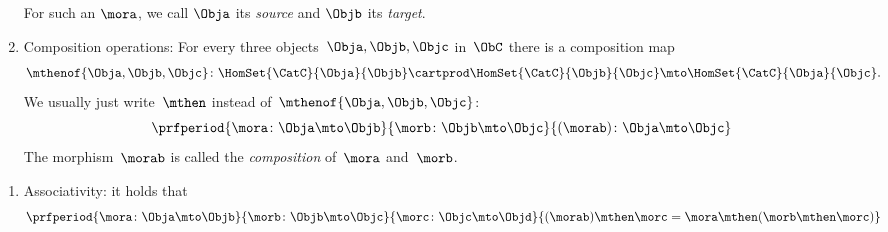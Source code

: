 \begin{ctdefinition}[Semicategory]
\begin{body}
\begin{enumerate}
                  For such an $\mora$, we call $\Obja$ its \emph{source} and $\Objb$ its \emph{target}.
            \item \label{semicategory-composition}  Composition operations: For every three objects~$\Obja,\Objb,\Objc$ in~$\ObC$ there is a composition map
                  \begin{equation}
                      \mthenof{\Obja,\Objb,\Objc}\colon \HomSet{\CatC}{\Obja}{\Objb} \cartprod \HomSet{\CatC}{\Objb}{\Objc}\mto \HomSet{\CatC}{\Obja}{\Objc}.
                  \end{equation}
                  We usually just write~$\mthen$ instead of~$\mthenof{\Obja,\Objb,\Objc}$:
                  \begin{equation}
                      \prfperiod{
                          \mora \colon \Obja \mto \Objb
                      }{
                          \morb\colon \Objb \mto \Objc
                      }{
                          (\morab )\colon \Obja \mto \Objc
                      }
                  \end{equation}
                  The morphism~$\morab$ is called the \emph{composition} of~$\mora$ and~$\morb$.
        \end{enumerate}
        \condit
        \begin{enumerate}
            \item \label{semicategory-associativity}  Associativity: it holds that
                  \begin{equation}
                      \prfperiod{
                          \mora\colon \Obja \mto \Objb
                      }{
                          \morb\colon \Objb \mto \Objc
                      }{
                          \morc\colon \Objc \mto \Objd
                      }{
                          (\morab)
                          \mthen \morc= \mora \mthen (\morb \mthen \morc)
                      }
                  \end{equation}
        \end{enumerate}
    \end{body}
\end{ctdefinition}


